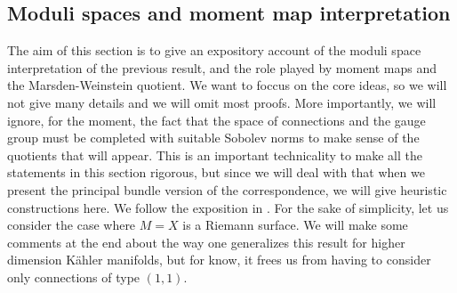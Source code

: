 




\subsection{Moduli spaces and moment map interpretation}
The aim of this section is to give an expository account of the moduli space interpretation of the previous result, and the role played by moment maps and the Marsden-Weinstein quotient. We want to foccus on the core ideas, so we will not give many details and we will omit most proofs. More importantly, we will ignore, for the moment, the fact that the space of connections and the gauge group must be completed with suitable Sobolev norms to make sense of the quotients that will appear. This is an important technicality to make all the statements in this section rigorous, but since we will deal with that when we present the principal bundle version of the correspondence, we will give heuristic constructions here. We follow the exposition in \parencite{garcia2007differential}. For the sake of simplicity, let us consider the case where \(M=X\) is a Riemann surface. We will make some comments at the end about the way one generalizes this result for higher dimension Kähler manifolds, but for know, it frees us from having to consider only connections of type \((1,1)\). \\

